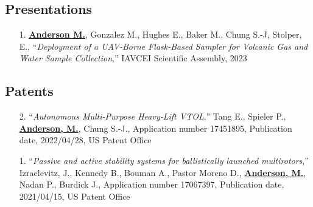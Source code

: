 \documentclass[12pt,letter,sans]{moderncv}        %
\begin{document}


    
    

\newpage

\subsection{Presentations}

\begin{itemize}
	\item [1.] \underline{\textbf{Anderson M.}}, Gonzalez M., Hughes E., Baker M., Chung S.-J, Stolper, E., ``\textit{Deployment of a UAV-Borne Flask-Based Sampler for Volcanic Gas and Water Sample Collection},'' IAVCEI Scientific Assembly, 2023
\end{itemize}

\subsection{Patents}

\begin{itemize}
    \item [2.] ``\textit{Autonomous Multi-Purpose Heavy-Lift VTOL},'' Tang E., Spieler P., \underline{\textbf{Anderson, M.}}, Chung S.-J., Application number 17451895, Publication date, 2022/04/28, US Patent Office

    \item [1.] ``\textit{Passive and active stability systems for ballistically launched multirotors},'' Izraelevitz, J., Kennedy B., Bouman A., Pastor Moreno D., \underline{\textbf{Anderson, M.}}, Nadan P., Burdick J., Application number 17067397, Publication date, 2021/04/15, US Patent Office
\end{itemize}
\end{document}
